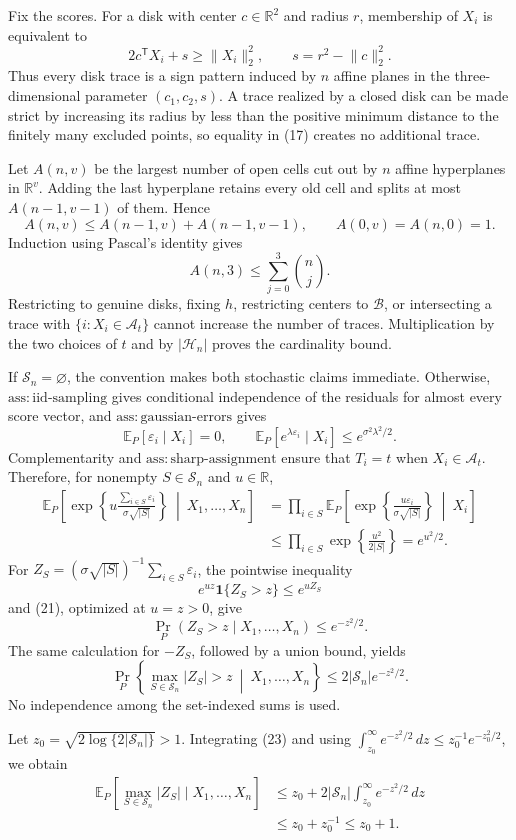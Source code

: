 Fix the scores. For a disk with center \(c\in\mathbb R^2\) and radius \(r\), membership of \(X_i\) is equivalent to
\[
 2c^{\mathsf T}X_i+s\ge\lVert X_i\rVert_2^2,\qquad
 s=r^2-\lVert c\rVert_2^2. \tag{17}
\]
Thus every disk trace is a sign pattern induced by \(n\) affine planes in the three-dimensional parameter \((c_1,c_2,s)\). A trace realized by a closed disk can be made strict by increasing its radius by less than the positive minimum distance to the finitely many excluded points, so equality in (17) creates no additional trace.

Let \(A(n,v)\) be the largest number of open cells cut out by \(n\) affine hyperplanes in \(\mathbb R^v\). Adding the last hyperplane retains every old cell and splits at most \(A(n-1,v-1)\) of them. Hence
\[
 A(n,v)\le A(n-1,v)+A(n-1,v-1),\qquad
 A(0,v)=A(n,0)=1. \tag{18}
\]
Induction using Pascal's identity gives
\[
 A(n,3)\le\sum_{j=0}^3\binom nj. \tag{19}
\]
Restricting to genuine disks, fixing \(h\), restricting centers to \(\mathcal B\), or intersecting a trace with \(\{i:X_i\in\mathcal A_t\}\) cannot increase the number of traces. Multiplication by the two choices of \(t\) and by \(|\mathcal H_n|\) proves the cardinality bound.

If \(\mathscr S_n=\varnothing\), the convention makes both stochastic claims immediate. Otherwise, \(\mathrm{ass:iid\text{-}sampling}\) gives conditional independence of the residuals for almost every score vector, and \(\mathrm{ass:gaussian\text{-}errors}\) gives
\[
 \mathbb E_P[\varepsilon_i\mid X_i]=0,\qquad
 \mathbb E_P[e^{\lambda\varepsilon_i}\mid X_i]\le e^{\sigma^2\lambda^2/2}. \tag{20}
\]
Complementarity and \(\mathrm{ass:sharp\text{-}assignment}\) ensure that \(T_i=t\) when \(X_i\in\mathcal A_t\). Therefore, for nonempty \(S\in\mathscr S_n\) and \(u\in\mathbb R\),
\[
 \begin{aligned}
 \mathbb E_P\!\left[
  \exp\!\left\{u\frac{\sum_{i\in S}\varepsilon_i}{\sigma\sqrt{|S|}}\right\}
  \ \middle|\ X_1,\ldots,X_n\right]
 &=\prod_{i\in S}\mathbb E_P\!\left[
  \exp\!\left\{\frac{u\varepsilon_i}{\sigma\sqrt{|S|}}\right\}
  \ \middle|\ X_i\right]\\
 &\le\prod_{i\in S}\exp\!\left\{\frac{u^2}{2|S|}\right\}
 =e^{u^2/2}.
 \end{aligned}\tag{21}
\]
For \(Z_S=(\sigma\sqrt{|S|})^{-1}\sum_{i\in S}\varepsilon_i\), the pointwise inequality
\[
 e^{uz}\mathbf 1\{Z_S>z\}\le e^{uZ_S}
\]
and (21), optimized at \(u=z>0\), give
\[
 \Pr_P(Z_S>z\mid X_1,\ldots,X_n)\le e^{-z^2/2}. \tag{22}
\]
The same calculation for \(-Z_S\), followed by a union bound, yields
\[
 \Pr_P\left\{\max_{S\in\mathscr S_n}|Z_S|>z
 \ \middle|\ X_1,\ldots,X_n\right\}
 \le2|\mathscr S_n|e^{-z^2/2}. \tag{23}
\]
No independence among the set-indexed sums is used.

Let \(z_0=\sqrt{2\log\{2|\mathscr S_n|\}}>1\). Integrating (23) and using
\(\int_{z_0}^{\infty}e^{-z^2/2}\,dz\le z_0^{-1}e^{-z_0^2/2}\), we obtain
\[
 \begin{aligned}
 \mathbb E_P\!\left[\max_{S\in\mathscr S_n}|Z_S|
 \mid X_1,\ldots,X_n\right]
 &\le z_0+2|\mathscr S_n|\int_{z_0}^{\infty}e^{-z^2/2}\,dz\\
 &\le z_0+z_0^{-1}\le z_0+1.
 \end{aligned}
\]